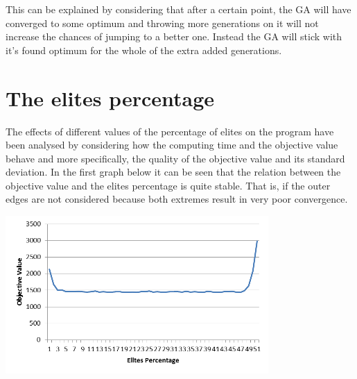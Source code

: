 \par
This can be explained by considering that after a certain point, the GA will have converged to some optimum and throwing more generations on it will not increase the chances of jumping to a better one. Instead the GA will stick with it’s found optimum for the whole of the extra added generations.

\newpage
\section{The elites percentage}

\par
The effects of different values of the percentage of elites on the program have been analysed by considering how the computing time and the objective value behave and more specifically, the quality of the objective value and its standard deviation.
In the first graph below it can be seen that the relation between the objective value and the elites percentage is quite stable. That is, if the outer edges are not considered because both extremes result in very poor convergence.

	\includegraphics[height=6cm]{OVEP}

